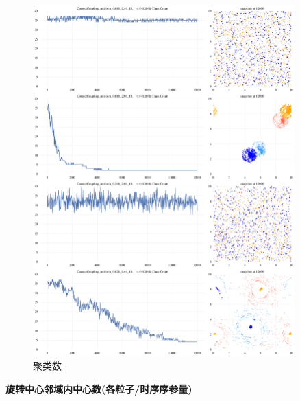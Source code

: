 \documentclass{article}
\begin{document}
\begin{figure}[H]
	\centering
	\includegraphics[width=0.9\textwidth]{./figs/classCountsOp.png}
	\caption{聚类数}
	\label{fig:fig234t.4}
\end{figure}

\newpage
\noindent\textbf{旋转中心邻域内中心数(各粒子/时序序参量)}
\end{document}
